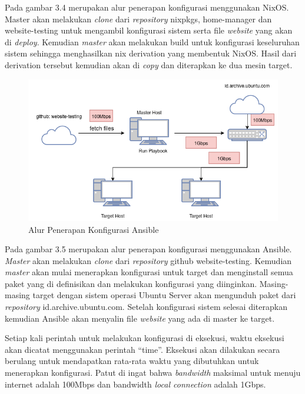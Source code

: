 \documentclass[10pt,twoside]{report}
\begin{document}
\begin{adjustwidth}{20pt}{}
	Pada gambar 3.4 merupakan alur penerapan konfigurasi menggunakan NixOS.
	Master akan melakukan \textit{clone} dari \textit{repository} nixpkgs,
	home-manager dan website-testing untuk mengambil konfigurasi sistem serta
	file \textit{website} yang akan di \textit{deploy}. Kemudian \textit{master}
	akan melakukan build untuk konfigurasi keseluruhan sistem sehingga
	menghasilkan nix derivation yang membentuk NixOS. Hasil dari derivation
	tersebut kemudian akan di \textit{copy} dan diterapkan ke dua mesin target.
	\newpage
	\begin{figure}[H]
		\centering
		\includegraphics[width=\textwidth]{images/ansible-topology-revision.png}
		\caption{Alur Penerapan Konfigurasi Ansible}
	\end{figure}
	Pada gambar 3.5 merupakan alur penerapan konfigurasi menggunakan Ansible.
	\textit{Master} akan melakukan \textit{clone} dari \textit{repository} github
	website-testing. Kemudian \textit{master} akan mulai menerapkan konfigurasi
	untuk target dan menginstall semua paket yang di definisikan dan melakukan
	konfigurasi yang diinginkan. Masing-masing target dengan sistem operasi
	Ubuntu Server akan mengunduh paket dari \textit{repository}
	id.archive.ubuntu.com.
	Setelah konfigurasi sistem selesai diterapkan kemudian Ansible akan menyalin
	file \textit{website} yang ada di master ke target.

	Setiap kali perintah untuk melakukan konfigurasi di eksekusi, waktu eksekusi
	akan dicatat menggunakan perintah “time”. Eksekusi akan dilakukan secara
	berulang untuk mendapatkan rata-rata waktu yang dibutuhkan untuk menerapkan
	konfigurasi.
	Patut di ingat bahwa \textit{bandwidth} maksimal untuk menuju internet
	adalah 100Mbps dan bandwidth \textit{local connection} adalah 1Gbps.
\end{adjustwidth}
\end{document}

